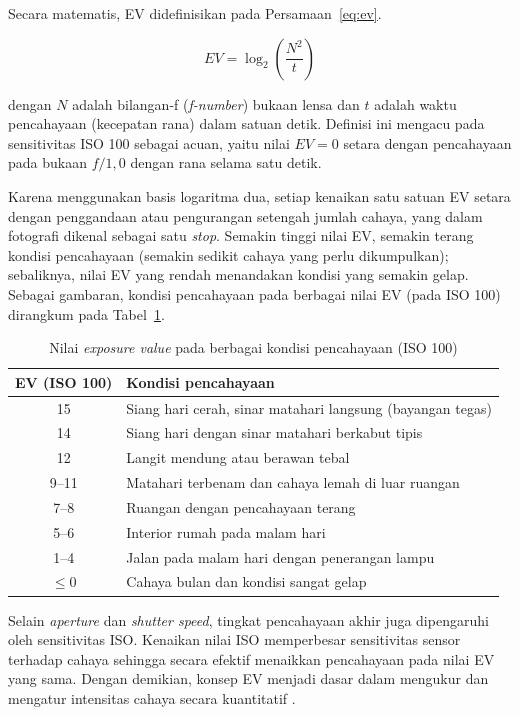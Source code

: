 Secara matematis, EV didefinisikan pada Persamaan~\eqref{eq:ev}.

\begin{equation}
\label{eq:ev}
EV = \log_2 \left( \frac{N^2}{t} \right)
\end{equation}

dengan $N$ adalah bilangan-f (\emph{f-number}) bukaan lensa dan $t$ adalah waktu
pencahayaan (kecepatan rana) dalam satuan detik. Definisi ini mengacu pada
sensitivitas ISO 100 sebagai acuan, yaitu nilai $EV = 0$ setara dengan pencahayaan
pada bukaan $f/1{,}0$ dengan rana selama satu detik.

Karena menggunakan basis logaritma dua, setiap kenaikan satu satuan EV setara
dengan penggandaan atau pengurangan setengah jumlah cahaya, yang dalam fotografi
dikenal sebagai satu \emph{stop}. Semakin tinggi nilai EV, semakin terang kondisi
pencahayaan (semakin sedikit cahaya yang perlu dikumpulkan); sebaliknya, nilai EV
yang rendah menandakan kondisi yang semakin gelap. Sebagai gambaran, kondisi
pencahayaan pada berbagai nilai EV (pada ISO 100) dirangkum pada
Tabel~\ref{tab:ev}.

\begin{table}[H]
\centering
\caption{Nilai \emph{exposure value} pada berbagai kondisi pencahayaan (ISO 100)}
\label{tab:ev}
\renewcommand{\arraystretch}{1.3}
\begin{tabularx}{\linewidth}{|c|>{\raggedright\arraybackslash}X|}
\hline
\textbf{EV (ISO 100)} & \textbf{Kondisi pencahayaan} \\
\hline
15 & Siang hari cerah, sinar matahari langsung (bayangan tegas) \\
\hline
14 & Siang hari dengan sinar matahari berkabut tipis \\
\hline
12 & Langit mendung atau berawan tebal \\
\hline
9--11 & Matahari terbenam dan cahaya lemah di luar ruangan \\
\hline
7--8 & Ruangan dengan pencahayaan terang \\
\hline
5--6 & Interior rumah pada malam hari \\
\hline
1--4 & Jalan pada malam hari dengan penerangan lampu \\
\hline
$\leq 0$ & Cahaya bulan dan kondisi sangat gelap \\
\hline
\end{tabularx}
\end{table}

Selain \emph{aperture} dan \emph{shutter speed}, tingkat pencahayaan akhir juga
dipengaruhi oleh sensitivitas ISO. Kenaikan nilai ISO memperbesar sensitivitas
sensor terhadap cahaya sehingga secara efektif menaikkan pencahayaan pada nilai EV
yang sama. Dengan demikian, konsep EV menjadi dasar dalam mengukur dan mengatur
intensitas cahaya secara kuantitatif \parencite{expval}. 

